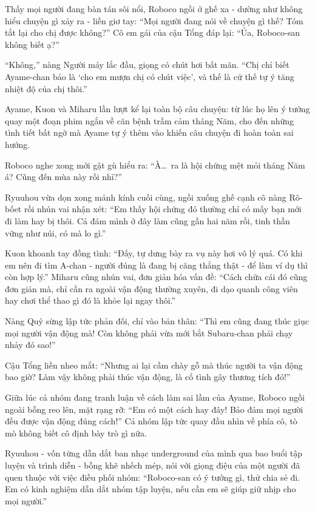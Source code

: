 \documentclass[../main.tex]{subfiles}
\begin{document}
Thấy mọi người đang bàn tán sôi nổi, Roboco ngồi ở ghế xa - dường như không hiểu chuyện gì xảy ra - liền giơ tay: ``Mọi người đang nói về chuyện gì thế? Tóm tắt lại cho chị được không?'' Cô em gái của cậu Tổng đáp lại: ``Ủa, Roboco-san không biết ạ?''

``Không,'' nàng Người máy lắc đầu, giọng có chút hơi bất mãn. ``Chị chỉ biết Ayame-chan bảo là `cho em mượn chị có chút việc', và thế là cứ thế tự ý tăng nhiệt độ của chị thôi.''

Ayame, Kuon và Miharu lần lượt kể lại toàn bộ câu chuyện: từ lúc họ lên ý tưởng quay một đoạn phim ngắn về căn bệnh trầm cảm tháng Năm, cho đến những tình tiết bất ngờ mà Ayame tự ý thêm vào khiến câu chuyện đi hoàn toàn sai hướng.

Roboco nghe xong mới gật gù hiểu ra: ``À\dots\ ra là hội chứng mệt mỏi tháng Năm á? Cũng đến mùa này rồi nhỉ?''

Ryuuhou vừa dọn xong mảnh kính cuối cùng, ngồi xuống ghế cạnh cô nàng Rô-bốet rồi nhún vai nhận xét: ``Em thấy hội chứng đó thường chỉ có mấy bạn mới đi làm hay bị thôi. Cả đám mình ở đây làm cũng gần hai năm rồi, tinh thần vững như núi, có mà lo gì.''

Kuon khoanh tay đồng tình: ``Đấy, tự dưng bày ra vụ này hơi vô lý quá. Có khi em nên đi tìm A-chan - người đúng là đang bị căng thẳng thật - để làm ví dụ thì còn hợp lý.'' Miharu cũng nhún vai, đơn giản hóa vấn đề: ``Cách chữa cái đó cũng đơn giản mà, chỉ cần ra ngoài vận động thường xuyên, đi dạo quanh công viên hay chơi thể thao gì đó là khỏe lại ngay thôi.''

Nàng Quỷ sừng lập tức phản đối, chỉ vào bản thân: ``Thì em cũng đang thúc giục mọi người vận động mà! Còn không phải vừa mới bắt Subaru-chan phải chạy nhảy đó sao!''

Cậu Tổng liền nheo mắt: ``Nhưng ai lại cầm chày gỗ mà thúc người ta vận động bao giờ? Làm vậy không phải thúc vận động, là cố tình gây thương tích đó!''

Giữa lúc cả nhóm đang tranh luận về cách làm sai lầm của Ayame, Roboco ngồi ngoài bỗng reo lên, mặt rạng rỡ: ``Em có một cách hay đây! Bảo đảm mọi người đều được vận động đúng cách!'' Cả nhóm lập tức quay đầu nhìn về phía cô, tò mò không biết cô định bày trò gì nữa.

Ryuuhou - vốn từng dẫn dắt ban nhạc underground của mình qua bao buổi tập luyện và trình diễn - bỗng khẽ nhếch mép, nói với giọng điệu của một người đã quen thuộc với việc điều phối nhóm: ``Roboco-san có ý tưởng gì, thử chia sẻ đi. Em có kinh nghiệm dẫn dắt nhóm tập luyện, nếu cần em sẽ giúp giữ nhịp cho mọi người.''
\end{document}
